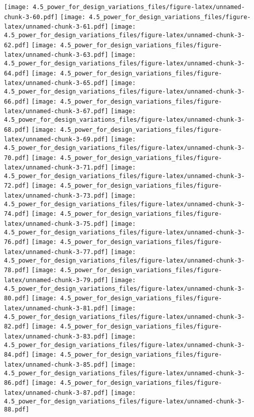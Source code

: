 \documentclass[]{article}
\begin{document}
\texttt{[image: 4.5\_power\_for\_design\_variations\_files/figure-latex/unnamed-chunk-3-60.pdf]}
\texttt{[image: 4.5\_power\_for\_design\_variations\_files/figure-latex/unnamed-chunk-3-61.pdf]}
\texttt{[image: 4.5\_power\_for\_design\_variations\_files/figure-latex/unnamed-chunk-3-62.pdf]}
\texttt{[image: 4.5\_power\_for\_design\_variations\_files/figure-latex/unnamed-chunk-3-63.pdf]}
\texttt{[image: 4.5\_power\_for\_design\_variations\_files/figure-latex/unnamed-chunk-3-64.pdf]}
\texttt{[image: 4.5\_power\_for\_design\_variations\_files/figure-latex/unnamed-chunk-3-65.pdf]}
\texttt{[image: 4.5\_power\_for\_design\_variations\_files/figure-latex/unnamed-chunk-3-66.pdf]}
\texttt{[image: 4.5\_power\_for\_design\_variations\_files/figure-latex/unnamed-chunk-3-67.pdf]}
\texttt{[image: 4.5\_power\_for\_design\_variations\_files/figure-latex/unnamed-chunk-3-68.pdf]}
\texttt{[image: 4.5\_power\_for\_design\_variations\_files/figure-latex/unnamed-chunk-3-69.pdf]}
\texttt{[image: 4.5\_power\_for\_design\_variations\_files/figure-latex/unnamed-chunk-3-70.pdf]}
\texttt{[image: 4.5\_power\_for\_design\_variations\_files/figure-latex/unnamed-chunk-3-71.pdf]}
\texttt{[image: 4.5\_power\_for\_design\_variations\_files/figure-latex/unnamed-chunk-3-72.pdf]}
\texttt{[image: 4.5\_power\_for\_design\_variations\_files/figure-latex/unnamed-chunk-3-73.pdf]}
\texttt{[image: 4.5\_power\_for\_design\_variations\_files/figure-latex/unnamed-chunk-3-74.pdf]}
\texttt{[image: 4.5\_power\_for\_design\_variations\_files/figure-latex/unnamed-chunk-3-75.pdf]}
\texttt{[image: 4.5\_power\_for\_design\_variations\_files/figure-latex/unnamed-chunk-3-76.pdf]}
\texttt{[image: 4.5\_power\_for\_design\_variations\_files/figure-latex/unnamed-chunk-3-77.pdf]}
\texttt{[image: 4.5\_power\_for\_design\_variations\_files/figure-latex/unnamed-chunk-3-78.pdf]}
\texttt{[image: 4.5\_power\_for\_design\_variations\_files/figure-latex/unnamed-chunk-3-79.pdf]}
\texttt{[image: 4.5\_power\_for\_design\_variations\_files/figure-latex/unnamed-chunk-3-80.pdf]}
\texttt{[image: 4.5\_power\_for\_design\_variations\_files/figure-latex/unnamed-chunk-3-81.pdf]}
\texttt{[image: 4.5\_power\_for\_design\_variations\_files/figure-latex/unnamed-chunk-3-82.pdf]}
\texttt{[image: 4.5\_power\_for\_design\_variations\_files/figure-latex/unnamed-chunk-3-83.pdf]}
\texttt{[image: 4.5\_power\_for\_design\_variations\_files/figure-latex/unnamed-chunk-3-84.pdf]}
\texttt{[image: 4.5\_power\_for\_design\_variations\_files/figure-latex/unnamed-chunk-3-85.pdf]}
\texttt{[image: 4.5\_power\_for\_design\_variations\_files/figure-latex/unnamed-chunk-3-86.pdf]}
\texttt{[image: 4.5\_power\_for\_design\_variations\_files/figure-latex/unnamed-chunk-3-87.pdf]}
\texttt{[image: 4.5\_power\_for\_design\_variations\_files/figure-latex/unnamed-chunk-3-88.pdf]}
\end{document}
